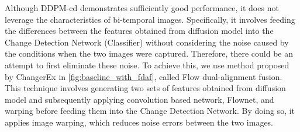 \documentclass[../main.tex]{subfiles}
\begin{document}
\textbf{}
Although DDPM-cd demonstrates sufficiently good performance, it does not leverage the characteristics of bi-temporal images. Specifically, it involves feeding the differences between the features obtained from diffusion model into the Change Detection Network (Classifier) without considering the noise caused by the conditions when the two images were captured. Therefore, there could be an attempt to first eliminate these noise. To achieve this, we use method proposed by ChangerEx in \ref{fig:baseline_with_fdaf}, called Flow dual-alignment fusion.\cite{fang2023changerex} This technique involves generating two sets of features obtained from diffusion model and subsequently applying convolution based network, Flownet, and warping before feeding them into the Change Detection Network. By doing so, it applies image warping, which reduces noise errors between the two images.
\end{document}
